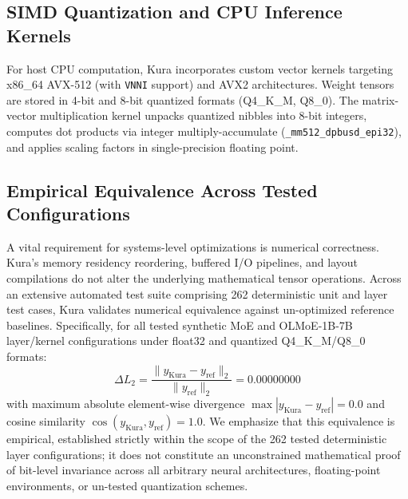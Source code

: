 \subsection{SIMD Quantization and CPU Inference Kernels}
For host CPU computation, Kura incorporates custom vector kernels targeting x86\_64 AVX-512 (with \texttt{VNNI} support) and AVX2 architectures. Weight tensors are stored in 4-bit and 8-bit quantized formats (Q4\_K\_M, Q8\_0). The matrix-vector multiplication kernel unpacks quantized nibbles into 8-bit integers, computes dot products via integer multiply-accumulate (\texttt{\_mm512\_dpbusd\_epi32}), and applies scaling factors in single-precision floating point.

\subsection{Empirical Equivalence Across Tested Configurations}
A vital requirement for systems-level optimizations is numerical correctness. Kura's memory residency reordering, buffered I/O pipelines, and layout compilations do not alter the underlying mathematical tensor operations.
Across an extensive automated test suite comprising 262 deterministic unit and layer test cases, Kura validates numerical equivalence against un-optimized reference baselines. Specifically, for all tested synthetic MoE and OLMoE-1B-7B layer/kernel configurations under float32 and quantized Q4\_K\_M/Q8\_0 formats:
\begin{equation}
    \Delta L_2 = \frac{\| y_{\text{Kura}} - y_{\text{ref}} \|_2}{\| y_{\text{ref}} \|_2} = 0.00000000
\end{equation}
with maximum absolute element-wise divergence $\max |y_{\text{Kura}} - y_{\text{ref}}| = 0.0$ and cosine similarity $\cos(y_{\text{Kura}}, y_{\text{ref}}) = 1.0$.
We emphasize that this equivalence is empirical, established strictly within the scope of the 262 tested deterministic layer configurations; it does not constitute an unconstrained mathematical proof of bit-level invariance across all arbitrary neural architectures, floating-point environments, or un-tested quantization schemes.
